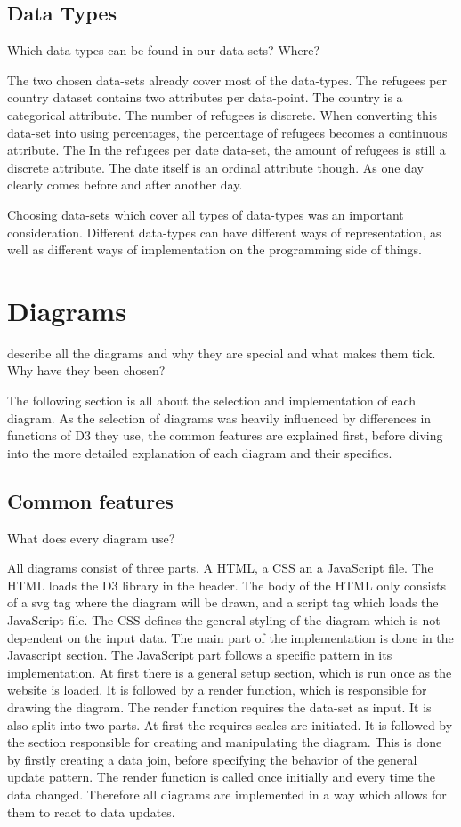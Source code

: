 \subsection{Data Types}
Which data types can be found in our data-sets? Where?

The two chosen data-sets already cover most of the data-types. The refugees per country dataset contains two attributes per data-point. The country is a categorical attribute. The number of refugees is discrete. When converting this data-set into using percentages, the percentage of refugees becomes a continuous attribute. The In the refugees per date data-set, the amount of refugees is still a discrete attribute. The date itself is an ordinal attribute though. As one day clearly comes before and after another day.

Choosing data-sets which cover all types of data-types was an important consideration. Different data-types can have different ways of representation, as well as different ways of implementation on the programming side of things.


\section{Diagrams}
describe all the diagrams and why they are special and what makes them tick. Why have they been chosen?

The following section is all about the selection and implementation of each diagram. As the selection of diagrams was heavily influenced by differences in functions of D3 they use, the common features are explained first, before diving into the more detailed explanation of each diagram and their specifics.

\subsection{Common features}
What does every diagram use?

All diagrams consist of three parts. A HTML, a CSS an a JavaScript file. The HTML loads the D3 library in the header. The body of the HTML only consists of a svg tag where the diagram will be drawn, and a script tag which loads the JavaScript file. The CSS defines the general styling of the diagram which is not dependent on the input data. The main part of the implementation is done in the Javascript section.
The JavaScript part follows a specific pattern in its implementation. At first there is a general setup section, which is run once as the website is loaded. It is followed by a render function, which is responsible for drawing the diagram. The render function requires the data-set as input. It is also split into two parts. At first the requires scales are initiated. It is followed by the section responsible for creating and manipulating the diagram. This is done by firstly creating a data join, before specifying the behavior of the general update pattern. The render function is called once initially and every time the data changed. Therefore all diagrams are implemented in a way which allows for them to react to data updates.

